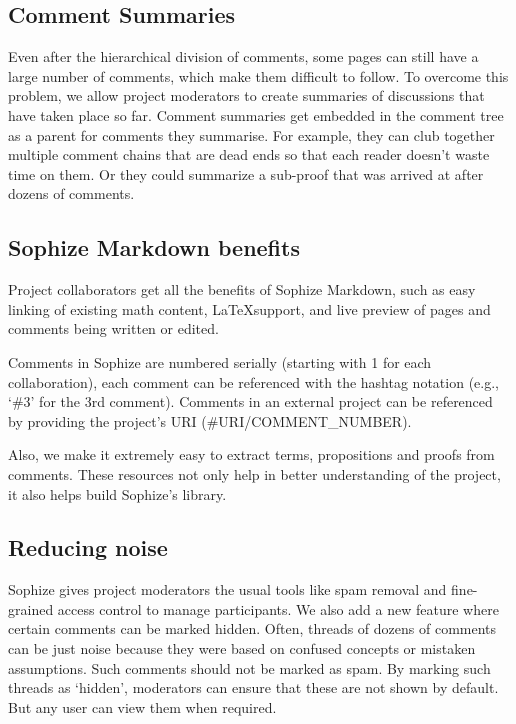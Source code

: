 \documentclass[a4paper]{article}
\begin{document}
\subsection{Comment Summaries}

Even after the hierarchical division of comments, some pages can still have a large number of comments, which make them difficult to follow. To overcome this problem, we allow project moderators to create summaries of discussions that have taken place so far. Comment summaries get embedded in the comment tree as a parent for comments they summarise. For example, they can club together multiple comment chains that are dead ends so that each reader doesn't waste time on them. Or they could summarize a sub-proof that was arrived at after dozens of comments.

\subsection{Sophize Markdown benefits}

Project collaborators get all the benefits of Sophize Markdown, such as easy linking of existing math content, \LaTeX\space support, and live preview of pages and comments being written or edited.

Comments in Sophize are numbered serially (starting with 1 for each collaboration), each comment can be referenced with the hashtag notation (e.g., `\#3' for the 3rd comment). Comments in an external project can be referenced by providing the project's URI (\#URI/COMMENT\_NUMBER).

Also, we make it extremely easy to extract terms, propositions and proofs from comments. These resources not only help in better understanding of the project, it also helps build Sophize's library.

\subsection{Reducing noise}

Sophize gives project moderators the usual tools like spam removal and fine-grained access control to manage participants. We also add a new feature where certain comments can be marked hidden. Often, threads of dozens of comments can be just noise because they were based on confused concepts or mistaken assumptions. Such comments should not be marked as spam. By marking such threads as `hidden', moderators can ensure that these are not shown by default. But any user can view them when required.
\end{document}
